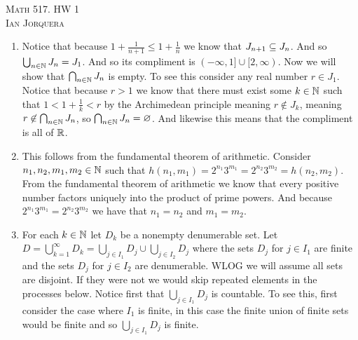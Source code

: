 \documentclass[12pt]{amsart}
\begin{document}
\begin{center}
    \textsc{Math 517. HW 1\\ Ian Jorquera}
\end{center}
\vspace{1em}

\begin{enumerate}
    \item
          Notice that because $1+\frac{1}{n+1}\leq 1+\frac{1}{n}$ we know that $J_{n+1}
              \subseteq J_n$. And so $\bigcup_{n\in\mathbb{N}}J_n=J_1$. And so its compliment is $(-\infty,1]\cup [2,\infty)$. Now we will show that
          $\bigcap_{n\in\mathbb{N}}J_n$ is empty. To see this consider any real number $r\in
              J_1$. Notice that because $r>1$ we know that there must exist some $k\in \mathbb{N}$
          such that $1<1+\frac{1}{k}<r$ by the Archimedean principle meaning $r\not\in
              J_{k}$, meaning $r\not\in \bigcap_{n\in\mathbb{N}}J_n$, so
          $\bigcap_{n\in\mathbb{N}}J_n=\varnothing$. And likewise this means that the compliment is all of $\mathbb{R}$.



    \item This follows from the fundamental theorem of arithmetic. Consider
          $n_1,n_2,m_1,m_2\in \mathbb{N}$ such that
          $h(n_1,m_1)=2^{n_1}3^{m_1}=2^{n_2}3^{m_2}=h(n_2,m_2)$. From the fundamental
          theorem of arithmetic we know that every positive number factors uniquely into
          the product of prime powers. And because $2^{n_1}3^{m_1}=2^{n_2}3^{m_2}$ we
          have that $n_1=n_2$ and $m_1=m_2$.


    \item For each $k\in\mathbb{N}$ let $D_k$ be a nonempty denumerable set. Let
          $D=\bigcup_{k=1}^{\infty}D_k=\bigcup_{j\in I_1}D_j\cup \bigcup_{j\in I_2}D_j$
          where the sets $D_j$ for $j\in I_1$ are finite and the sets $D_j$ for $j\in
              I_2$ are denumerable. WLOG we will assume all sets are disjoint. If they were
          not we would skip repeated elements in the processes below. Notice first that
          $\bigcup_{j\in I_1}D_j$ is countable. To see this, first consider the case
          where $I_1$ is finite, in this case the finite union of finite sets would be
          finite and so $\bigcup_{j\in I_1}D_j$ is finite.
          


\end{enumerate}
\end{document}
